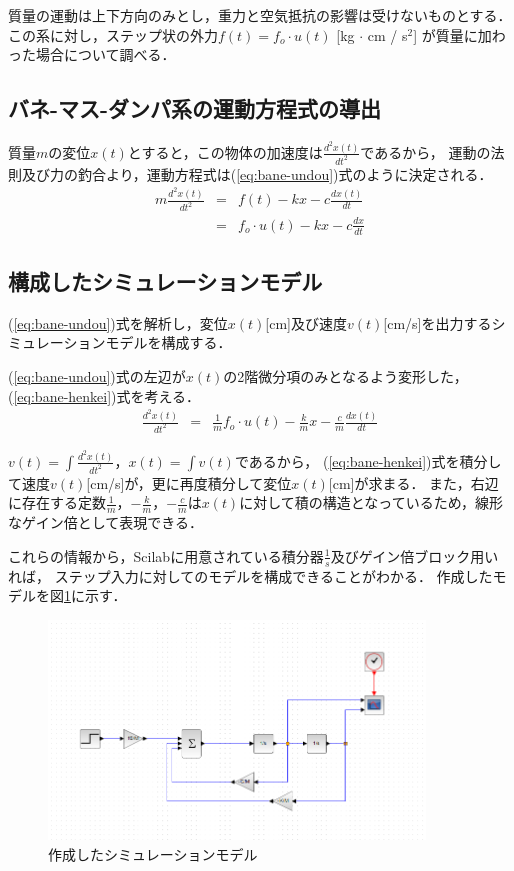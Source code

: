 \documentclass[dvipdfmx,titlepage,a4j]{jsarticle}  %
\begin{document}
質量の運動は上下方向のみとし，重力と空気抵抗の影響は受けないものとする．
この系に対し，ステップ状の外力$f(t) = f_o \cdot u(t)$ [kg $\cdot$ cm / s$^2$]
が質量に加わった場合について調べる．

\subsection{バネ-マス-ダンパ系の運動方程式の導出}
質量$m$の変位$x(t)$とすると，この物体の加速度は$\frac{d^2x(t)}{dt^2}$であるから，
運動の法則及び力の釣合より，運動方程式は(\ref{eq:bane-undou})式のように決定される．
\begin{eqnarray}
  m \frac{d^2x(t)}{dt^2} &=& f(t) - kx - c \frac{dx(t)}{dt} \nonumber \\
  &=& f_o \cdot u(t) - kx - c \frac{dx}{dt} \label{eq:bane-undou}
\end{eqnarray}

\subsection{構成したシミュレーションモデル}

(\ref{eq:bane-undou})式を解析し，変位$x(t)$[cm]及び速度$v(t)$[cm/s]を出力するシミュレーションモデルを構成する．

(\ref{eq:bane-undou})式の左辺が$x(t)$の2階微分項のみとなるよう変形した，(\ref{eq:bane-henkei})式を考える．
\begin{eqnarray}
  \frac{d^2x(t)}{dt^2} &=&  \frac{1}{m} f_o \cdot u(t) - \frac{k}{m} x - \frac{c}{m} \frac{dx(t)}{dt} \label{eq:bane-henkei}
\end{eqnarray}

$v(t) = \int \frac{d^2x(t)}{dt^2}$，$x(t) = \int v(t)$であるから，
(\ref{eq:bane-henkei})式を積分して速度$v(t)$[cm/s]が，更に再度積分して変位$x(t)$[cm]が求まる．
また，右辺に存在する定数$\frac{1}{m}$，$- \frac{k}{m}$，$- \frac{c}{m}$は$x(t)$に対して積の構造となっているため，線形なゲイン倍として表現できる．

これらの情報から，Scilabに用意されている積分器$\frac{1}{s}$及びゲイン倍ブロック用いれば，
ステップ入力に対してのモデルを構成できることがわかる．
作成したモデルを図\ref{fig:bane-model.png}に示す．

\begin{figure}[H]
  \centering
  \includegraphics[width=10cm]{../graph/bane-model.png}
  \caption{作成したシミュレーションモデル}
  \label{fig:bane-model.png}
\end{figure}
\end{document}

